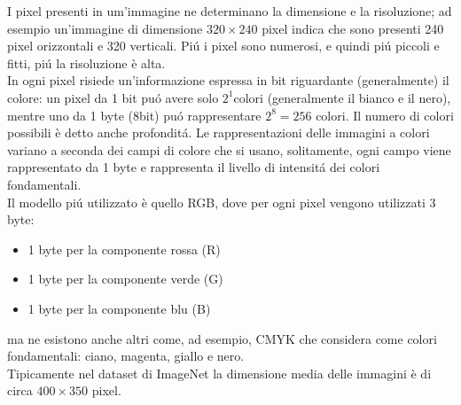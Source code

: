 \documentclass[a4paper,12pt,oneside]{book}
\begin{document}
I pixel presenti in um'immagine ne determinano la dimensione e la risoluzione; ad esempio un'immagine di dimensione $320 \times 240$ pixel indica che sono presenti 240 pixel orizzontali e 320 verticali. Pi\'{u} i pixel sono numerosi, e quindi pi\'{u} piccoli e fitti, pi\'{u} la risoluzione \`e alta.\\
In ogni pixel risiede un'informazione espressa in bit riguardante (generalmente) il colore: un pixel da 1 bit pu\'{o} avere solo $2^1$colori (generalmente il bianco e il nero), mentre uno da 1 byte (8bit)  pu\'{o} rappresentare $2^8=256$ colori. Il numero di colori possibili \`e detto anche profondit\'{a}. Le rappresentazioni delle immagini a colori variano a seconda dei campi di colore che si usano, solitamente, ogni campo viene rappresentato da 1 byte e rappresenta il livello di intensit\'{a} dei colori fondamentali.\\
Il modello pi\'{u} utilizzato \`e quello RGB, dove per ogni pixel vengono utilizzati 3 byte:
\begin{itemize}
\item 1 byte per la componente rossa (R)
\item 1 byte per la componente verde (G)
\item 1 byte per la componente blu (B)
\end{itemize}
ma ne esistono anche altri come, ad esempio, CMYK che considera come colori fondamentali: ciano, magenta, giallo e nero.\\
Tipicamente nel dataset di ImageNet la dimensione media delle immagini \`e di circa $400 \times 350$ pixel.
\end{document}
